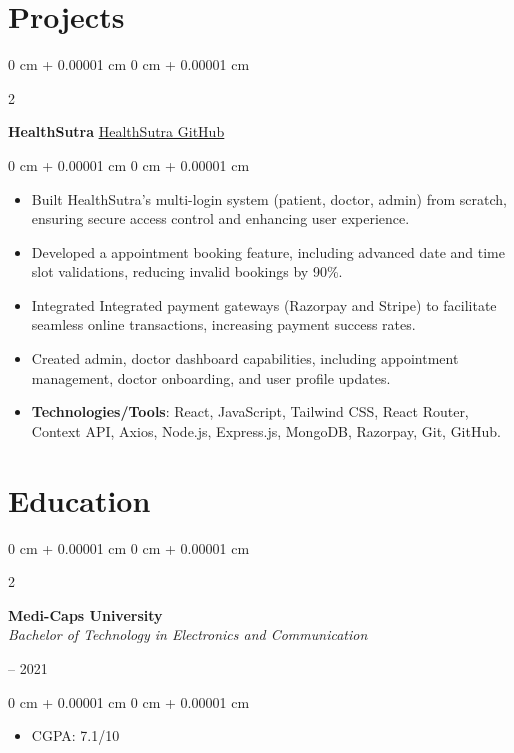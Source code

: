 \documentclass[10pt, letterpaper]{article}
\newenvironment{highlights}{
    \begin{itemize}[
        topsep=0.10 cm,
        parsep=0.10 cm,
        partopsep=0pt,
        itemsep=0pt,
        leftmargin=0 cm + 10pt
    ]
}{
    \end{itemize}
} %
\newenvironment{onecolentry}{
    \begin{adjustwidth}{
        0 cm + 0.00001 cm
    }{
        0 cm + 0.00001 cm
    }
}{
    \end{adjustwidth}
} %
\newenvironment{twocolentry}[2][]{
    \onecolentry
    \def\secondColumn{#2}
    \setcolumnwidth{\fill, 4.5 cm}
    \begin{paracol}{2}
}{
    \switchcolumn \raggedleft \secondColumn
    \end{paracol}
    \endonecolentry
} %
\begin{document}
   \section{Projects}

        \vspace{0.10 cm}


        
        \begin{twocolentry}{
            \href{https://github.com/sarthakvijayvargiya/healthsutra}{\underline{HealthSutra GitHub}}
        }
            \textbf{HealthSutra}\end{twocolentry}

        \vspace{0.10 cm}
        \begin{onecolentry}
            \begin{highlights}
                \item Built HealthSutra's multi-login system (patient, doctor, admin) from scratch, ensuring secure access control and enhancing user experience.
                \item Developed a appointment booking feature, including advanced date and time slot validations, reducing invalid bookings by 90\%.
                \item Integrated Integrated payment gateways (Razorpay and Stripe) to facilitate seamless online transactions, increasing payment success rates.
                \item Created admin, doctor dashboard capabilities, including appointment management, doctor onboarding, and user profile updates.
                \item \textbf{Technologies/Tools}: React, JavaScript, Tailwind CSS, React Router,  Context API, Axios, Node.js, Express.js, MongoDB, Razorpay, Git, GitHub.
            \end{highlights}
        \end{onecolentry}


        \vspace{0.20 cm}

      
    \section{Education}


\vspace{0.1 cm}
        
   \begin{twocolentry}{
    2017 – 2021
}
\textbf{Medi-Caps University} \\
\vspace{0.05 cm}
\textit{Bachelor of Technology in Electronics and Communication} 
\end{twocolentry}
        \vspace{0.10 cm}
        \begin{onecolentry}
            \begin{highlights}
                \item CGPA: 7.1/10
            \end{highlights}
        \end{onecolentry}
  
\end{document}
